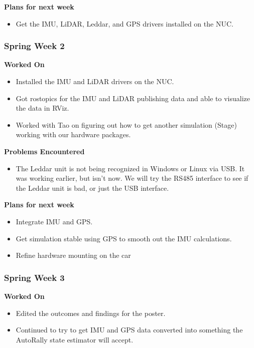 \documentclass[compsoc,draftclsnofoot,onecolumn,10pt]{IEEEtran}
\begin{document}
\textbf{Plans for next week}
\begin{itemize}
    \item Get the IMU, LiDAR, Leddar, and GPS drivers installed on the NUC.
\end{itemize}


\subsubsection*{Spring Week 2}
\textbf{Worked On}
\begin{itemize}
    \item Installed the IMU and LiDAR drivers on the NUC.
    \item Got rostopics for the IMU and LiDAR publishing data and able to visualize the data in RViz.
    \item Worked with Tao on figuring out how to get another simulation (Stage) working with our hardware packages.
\end{itemize}

\textbf{Problems Encountered}
\begin{itemize}
    \item The Leddar unit is not being recognized in Windows or Linux via USB. It was working earlier, but isn't now. We will try the RS485 interface to see if the Leddar unit is bad, or just the USB interface.
\end{itemize}

\textbf{Plans for next week}
\begin{itemize}
    \item Integrate IMU and GPS.
    \item Get simulation stable using GPS to smooth out the IMU calculations.
    \item Refine hardware mounting on the car
\end{itemize}

\subsubsection*{Spring Week 3}

\textbf{Worked On}
\begin{itemize}
    \item Edited the outcomes and findings for the poster.
    \item Continued to try to get IMU and GPS data converted into something the AutoRally state estimator will accept.
\end{itemize}
\end{document}
